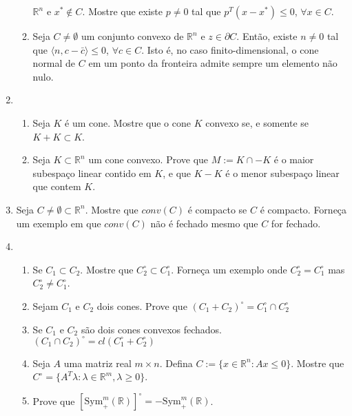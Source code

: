 \documentclass[a4paper,latin]{article}
\begin{document}
\begin{enumerate}
\begin{enumerate}
       	$\mathbb{R}^{n}$ e 
       	$x^* \notin C$. 
       	Mostre que existe  
       	$p \neq 0$ tal que 
       	$p^{T}(x-x^{*})\leq 0$, $\forall x \in C$.
       	\item Seja $C\neq \emptyset$ um conjunto convexo de 
       	$\mathbb{R}^{n}$ e $z \in \partial C$. Então, 
       	existe $n \neq 0$ 
       	tal que $\langle n, c-\bar{c} \rangle \leq 0$, $\forall c \in C$. 
       	Isto é, no caso finito-dimensional, o 
       	cone normal de $C$ em um ponto da fronteira admite sempre 
       	um elemento não nulo.     
       \end{enumerate}
    \item  
      \begin{enumerate}
      \item Seja $K$ é um cone.
      Mostre que o cone $K$ convexo se, e somente se  
      $K+K \subset K$.
      \item Seja $K\subset \mathbb{R}^{n}$ um cone convexo. Prove que $M:=K \cap -K$
      é o maior subespaço linear contido em $K$, e que 
      $K-K$ é o menor subespaço linear que contem $K$.  
      \end{enumerate}
    \item Seja $C\neq \emptyset \subset \mathbb{R}^{n}$. 
    Mostre que $conv(C)$ é compacto se $C$ é compacto. 
    Forneça um exemplo em que $conv(C)$ não é fechado mesmo que $C$ for fechado.  
    \item 
      \begin{enumerate}
      \item Se $C_{1} \subset C_2$. Mostre que 
      $C_{2}^{\circ} \subset C_{1}^{\circ}$. 
      Forneça um exemplo 
      onde $C_{2}^{\circ}=C_{1}^{\circ}$ mas
      $C_{2}^{\circ} \neq C_{1}^{\circ}$. 
      \item Sejam $C_{1}$ e $C_2$ dois cones. 
      Prove que $(C_1+C_2)^{\circ}=C_{1}^{\circ}\cap C_{2}^{\circ}$
      \item Se        
      $C_{1}$ e $C_2$ são dois cones convexos fechados.
    $(C_1 \cap C_{2})^{\circ}=cl(C_{1}^{\circ}+
    C_2^{\circ})$   
      \item Seja $A$ uma 
      matriz real $m \times n$. 
      Defina 
      $C:=\{x \in \mathbb{R}^{n}:
      Ax \leq 0\}$.
      Mostre que 
      $C^{\circ}
      =\{A^{T}\lambda: 
      \lambda \in \mathbb{R}^{m}, 
      \lambda \geq 0\}$.
      \item Prove que $[\text{Sym}_{+}^{m}(\mathbb{R})]^{\circ}=
      -\text{Sym}_{+}^{m}(\mathbb{R})$.
      \end{enumerate}           

\end{enumerate}
\end{document}
